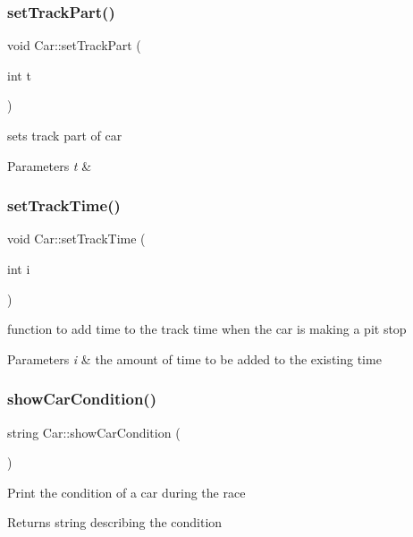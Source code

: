 \subsubsection{\texorpdfstring{set\+Track\+Part()}{setTrackPart()}}
{\footnotesize\ttfamily void Car\+::set\+Track\+Part (\begin{DoxyParamCaption}\item[{int}]{t }\end{DoxyParamCaption})\hspace{0.3cm}{\ttfamily [inline]}}

sets track part of car 
\begin{DoxyParams}{Parameters}
{\em t} & \\
\hline
\end{DoxyParams}
\mbox{\label{class_car_a744626ffab217629a2e9a35837531a44}} 
\subsubsection{\texorpdfstring{set\+Track\+Time()}{setTrackTime()}}
{\footnotesize\ttfamily void Car\+::set\+Track\+Time (\begin{DoxyParamCaption}\item[{int}]{i }\end{DoxyParamCaption})}

function to add time to the track time when the car is making a pit stop 
\begin{DoxyParams}{Parameters}
{\em i} & the amount of time to be added to the existing time \\
\hline
\end{DoxyParams}
\mbox{\label{class_car_af26b903e790eb44d638ba57e78e27e1b}} 
\subsubsection{\texorpdfstring{show\+Car\+Condition()}{showCarCondition()}}
{\footnotesize\ttfamily string Car\+::show\+Car\+Condition (\begin{DoxyParamCaption}{ }\end{DoxyParamCaption})}

Print the condition of a car during the race \begin{DoxyReturn}{Returns}
string describing the condition 
\end{DoxyReturn}
\mbox{\label{class_car_a19567ab900b1c676f0244b15ec14dbad}} 
